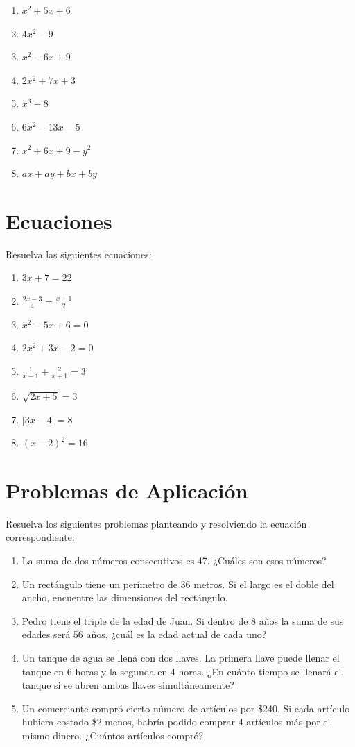 \documentclass[12pt,a4paper]{article}
\begin{document}
\begin{enumerate}
    \item $x^2 + 5x + 6$
    \item $4x^2 - 9$
    \item $x^2 - 6x + 9$
    \item $2x^2 + 7x + 3$
    \item $x^3 - 8$
    \item $6x^2 - 13x - 5$
    \item $x^2 + 6x + 9 - y^2$
    \item $ax + ay + bx + by$
\end{enumerate}

\section{Ecuaciones}
Resuelva las siguientes ecuaciones:

\begin{enumerate}
    \item $3x + 7 = 22$
    \item $\frac{2x - 3}{4} = \frac{x + 1}{2}$
    \item $x^2 - 5x + 6 = 0$
    \item $2x^2 + 3x - 2 = 0$
    \item $\frac{1}{x - 1} + \frac{2}{x + 1} = 3$
    \item $\sqrt{2x + 5} = 3$
    \item $|3x - 4| = 8$
    \item $(x - 2)^2 = 16$
\end{enumerate}

\section{Problemas de Aplicación}
Resuelva los siguientes problemas planteando y resolviendo la ecuación correspondiente:

\begin{enumerate}
    \item La suma de dos números consecutivos es 47. ¿Cuáles son esos números?
    
    \item Un rectángulo tiene un perímetro de 36 metros. Si el largo es el doble del ancho, encuentre las dimensiones del rectángulo.
    
    \item Pedro tiene el triple de la edad de Juan. Si dentro de 8 años la suma de sus edades será 56 años, ¿cuál es la edad actual de cada uno?
    
    \item Un tanque de agua se llena con dos llaves. La primera llave puede llenar el tanque en 6 horas y la segunda en 4 horas. ¿En cuánto tiempo se llenará el tanque si se abren ambas llaves simultáneamente?
    
    \item Un comerciante compró cierto número de artículos por \$240. Si cada artículo hubiera costado \$2 menos, habría podido comprar 4 artículos más por el mismo dinero. ¿Cuántos artículos compró?
\end{enumerate}
\end{document}
